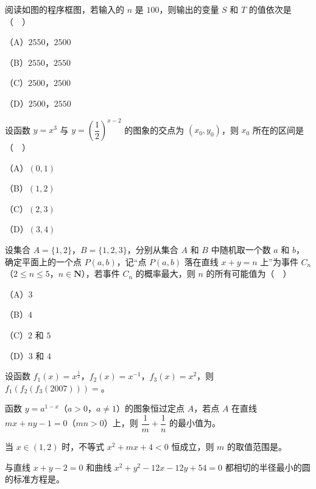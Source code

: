 \begin{question}
阅读如图的程序框图，若输入的 $n$ 是 $100$，则输出的变量 $S$ 和 $T$ 的值依次是（　）
\nopagebreak[4]
\begin{center}\end{center}
\nopagebreak[4]
（A）$2550$，$2500$

（B）$2550$，$2550$

（C）$2500$，$2500$

（D）$2500$，$2550$

\end{question}
\begin{question}
设函数 $y=x^3$ 与 $y=\left(\dfrac12\right)^{x-2}$ 的图象的交点为 $(x_0,y_0)$，则 $x_0$ 所在的区间是（　）

（A）$(0,1)$

（B）$(1,2)$

（C）$(2,3)$

（D）$(3,4)$

\end{question}
\begin{question}
设集合 $A=\{1,2\}$，$B=\{1,2,3\}$，分别从集合 $A$ 和 $B$ 中随机取一个数 $a$ 和 $b$，确定平面上的一个点 $P(a,b)$，记“点 $P(a,b)$ 落在直线 $x+y=n$ 上”为事件 $C_n$（$2\leqslant n\leqslant5$，$n\in\mathbf N$），若事件 $C_n$ 的概率最大，则 $n$ 的所有可能值为（　）

（A）$3$

（B）$4$

（C）$2$ 和 $5$

（D）$3$ 和 $4$

\end{question}

\begin{question}
设函数 $f_1(x)=x^{\frac12}$，$f_2(x)=x^{-1}$，$f_3(x)=x^2$，则 $f_1(f_2(f_3(2007)))=$\gkblank{}。

\end{question}
\begin{question}
函数 $y=a^{1-x}$（$a>0$，$a\neq1$）的图象恒过定点 $A$，若点 $A$ 在直线 $mx+ny-1=0$（$mn>0$）上，则 $\dfrac1m+\dfrac1n$ 的最小值为\gkblank{}。

\end{question}
\begin{question}
当 $x\in(1,2)$ 时，不等式 $x^2+mx+4<0$ 恒成立，则 $m$ 的取值范围是\gkblank{}。

\end{question}
\begin{question}
与直线 $x+y-2=0$ 和曲线 $x^2+y^2-12x-12y+54=0$ 都相切的半径最小的圆的标准方程是\gkblank{}。

\end{question}

